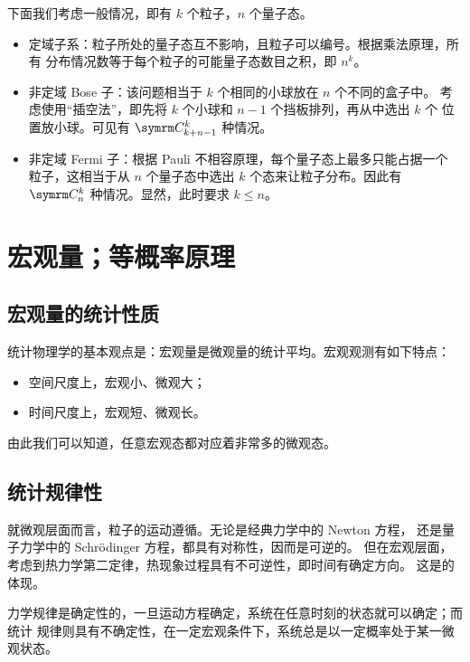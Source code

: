 下面我们考虑一般情况，即有 $k$ 个粒子，$n$ 个量子态。

\begin{itemize}
  \item 定域子系：粒子所处的量子态互不影响，且粒子可以编号。根据乘法原理，所有
    分布情况数等于每个粒子的可能量子态数目之积，即 $n^k$。
  \item 非定域 Bose 子：该问题相当于 $k$ 个相同的小球放在 $n$ 个不同的盒子中。
    考虑使用“插空法”，即先将 $k$ 个小球和 $n-1$ 个挡板排列，再从中选出 $k$ 个
    位置放小球。可见有 $\Cnum{k+n-1}{k}$ 种情况。
  \item 非定域 Fermi 子：根据 Pauli 不相容原理，每个量子态上最多只能占据一个
    粒子，这相当于从 $n$ 个量子态中选出 $k$ 个态来让粒子分布。因此有
    $\Cnum{n}{k}$ 种情况。显然，此时要求 $k \leqslant n$。
\end{itemize}

\section{宏观量；等概率原理}

\subsection{宏观量的统计性质}

统计物理学的基本观点是：宏观量是微观量的统计平均。宏观观测有如下特点：

\begin{itemize}
  \item 空间尺度上，宏观小、微观大；
  \item 时间尺度上，宏观短、微观长。
\end{itemize}

由此我们可以知道，任意宏观态都对应着非常多的微观态。

\subsection{统计规律性}

就微观层面而言，粒子的运动遵循。无论是经典力学中的 Newton 方程，
还是量子力学中的 Schrödinger 方程，都具有对称性，因而是可逆的。
但在宏观层面，考虑到热力学第二定律，热现象过程具有不可逆性，即时间有确定方向。
这是的体现。

力学规律是确定性的，一旦运动方程确定，系统在任意时刻的状态就可以确定；而统计
规律则具有不确定性，在一定宏观条件下，系统总是以一定概率处于某一微观状态。

